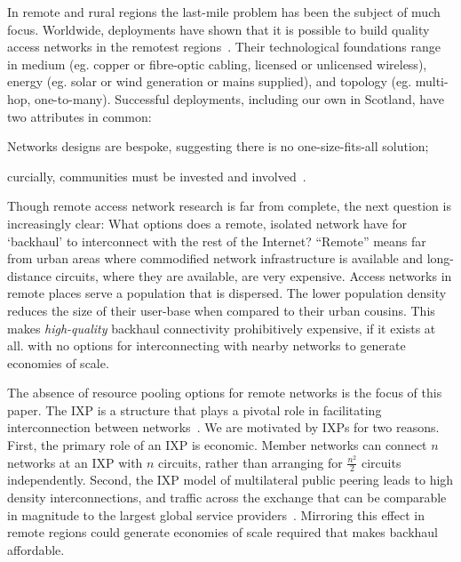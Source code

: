 In remote and rural regions the last-mile problem has been the subject of much
focus. Worldwide, deployments have shown that it is possible to build quality
access networks in the remotest regions~\cite{xxx}. Their technological
foundations range in medium (eg. copper or fibre-optic cabling, licensed
or unlicensed wireless), energy (eg. solar or wind generation or
mains supplied), and topology (eg. multi-hop,
one-to-many). Successful deployments, including our own in Scotland,
have two attributes in common:
\begin{inparaenum}[(i)]
  \item Networks designs are bespoke, suggesting
    there is no one-size-fits-all solution;
  \item curcially, communities must be invested and
  involved~\cite{Wallace:2015a,
    Wallace2015b}.
\end{inparaenum}

Though remote access network research is far from complete, the next question
is increasingly clear: What options does a remote, isolated network have for
`backhaul' to interconnect with the rest of the Internet? ``Remote'' means far
from urban areas where commodified network infrastructure is available and
long-distance circuits, where they are available, are very expensive. Access
networks in remote places serve a population that is dispersed. The lower
population density reduces the size of their user-base when compared to their
urban cousins. This makes \emph{high-quality} backhaul connectivity
prohibitively expensive, if it exists at all. with no options for
interconnecting with nearby networks to generate economies of scale.


The absence of resource pooling options for remote networks is the focus of this
paper. The \acf{IXP} is a structure
that plays a pivotal role in facilitating interconnection between
networks~\cite{Ager::2012}. We are motivated by \acp{IXP} for two reasons.
First, the primary role of an \ac{IXP} is economic. Member networks can
connect $n$ networks at an IXP with $n$ circuits, rather than arranging for
$\frac{n^2}{2}$ circuits independently. Second, the \ac{IXP} model of
multilateral public peering leads to high density interconnections, and traffic
across the exchange that can be comparable in magnitude to the largest global
service providers~\cite{Ager:2012:ALE:2342356.2342393}. Mirroring this effect in
remote regions could generate economies of scale required that makes backhaul
affordable.

